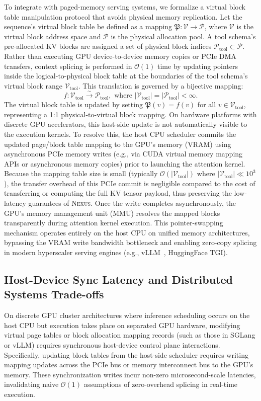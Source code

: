 \documentclass[conference,10pt]{IEEEtran}
\newcommand{\Nexus}{\textsc{Nexus}\xspace}
\begin{document}
To integrate with paged-memory serving systems, we formalize a virtual block table manipulation protocol that avoids physical memory replication. Let the sequence's virtual block table be defined as a mapping $\mathfrak{P}: \mathcal{V} \rightarrow \mathcal{P}$, where $\mathcal{V}$ is the virtual block address space and $\mathcal{P}$ is the physical allocation pool. A tool schema's pre-allocated KV blocks are assigned a set of physical block indices $\mathcal{P}_{\text{tool}} \subset \mathcal{P}$. Rather than executing GPU device-to-device memory copies or PCIe DMA transfers, context splicing is performed in $\mathcal{O}(1)$ time by updating pointers inside the logical-to-physical block table at the boundaries of the tool schema's virtual block range $\mathcal{V}_{\text{tool}}$. This translation is governed by a bijective mapping:
\begin{equation}
f: \mathcal{V}_{\text{tool}} \xrightarrow{\sim} \mathcal{P}_{\text{tool}}, \text{ where } |\mathcal{V}_{\text{tool}}| = |\mathcal{P}_{\text{tool}}| < \infty.
\end{equation}
The virtual block table is updated by setting $\mathfrak{P}(v) = f(v)$ for all $v \in \mathcal{V}_{\text{tool}}$, representing a 1:1 physical-to-virtual block mapping. On hardware platforms with discrete GPU accelerators, this host-side update is not automatically visible to the execution kernels. To resolve this, the host CPU scheduler commits the updated page/block table mapping to the GPU's memory (VRAM) using asynchronous PCIe memory writes (e.g., via CUDA virtual memory mapping APIs or asynchronous memory copies) prior to launching the attention kernel. Because the mapping table size is small (typically $\mathcal{O}(|\mathcal{V}_{\text{tool}}|)$ where $|\mathcal{V}_{\text{tool}}| \ll 10^3$), the transfer overhead of this PCIe commit is negligible compared to the cost of transferring or computing the full KV tensor payload, thus preserving the low-latency guarantees of \Nexus. Once the write completes asynchronously, the GPU's memory management unit (MMU) resolves the mapped blocks transparently during attention kernel execution. This pointer-swapping mechanism operates entirely on the host CPU on unified memory architectures, bypassing the VRAM write bandwidth bottleneck and enabling zero-copy splicing in modern hyperscaler serving engines (e.g., vLLM~\cite{kwon2023vllm}, HuggingFace TGI).

\subsection{Host-Device Sync Latency and Distributed Systems Trade-offs}
On discrete GPU cluster architectures where inference scheduling occurs on the host CPU but execution takes place on separated GPU hardware, modifying virtual page tables or block allocation mapping records (such as those in SGLang or vLLM) requires synchronous host-device control plane interactions. Specifically, updating block tables from the host-side scheduler requires writing mapping updates across the PCIe bus or memory interconnect bus to the GPU's memory. These synchronization writes incur non-zero microsecond-scale latencies, invalidating naive $\mathcal{O}(1)$ assumptions of zero-overhead splicing in real-time execution. 
\end{document}
